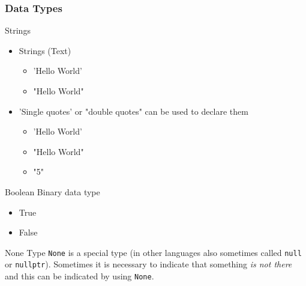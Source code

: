 \documentclass[10pt, a4paper]{beamer} %
\begin{document}
\begin{frame}[c, allowframebreaks]\frametitle{Data Types}
  \begin{block}{Strings}
    \begin{itemize}
      \item Strings (Text)
            \begin{itemize}
              \item {\color{blue}'Hello World'}
              \item {\color{red}"Hello World"}
            \end{itemize}
      \item {\color{blue} 'Single quotes'} or {\color{red} "double quotes"} can be used to declare them
            \begin{itemize}
              \item 'Hello World'
              \item "Hello World"
              \item "5"
            \end{itemize}
    \end{itemize}
  \end{block}
  \begin{block}{Boolean}
    Binary data type
    \begin{itemize}
      \item True
      \item False
    \end{itemize}
  \end{block}
  \framebreak
  \begin{block}{None Type}
    \texttt{None} is a special type (in other languages also sometimes called \texttt{null} or \texttt{nullptr}).
    Sometimes it is necessary to indicate that something \textit{is not there} and this can be indicated by using \texttt{None}.
  \end{block}


\end{frame}
\end{document}
